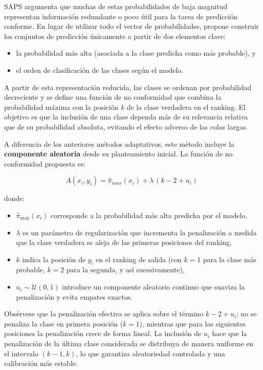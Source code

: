 SAPS argumenta que muchas de estas probabilidades de baja magnitud representan información redundante o poco útil para la tarea de predicción conforme. En lugar de utilizar todo el vector de probabilidades, propone construir los conjuntos de predicción únicamente a partir de dos elementos clave: 
\begin{itemize}
    \item la probabilidad más alta (asociada a la clase predicha como más probable), y
    \item el orden de clasificación de las clases según el modelo.
\end{itemize}

A partir de esta representación reducida, las clases se ordenan por probabilidad decreciente y se define una función de no conformidad que combina la probabilidad máxima con la posición $k$ de la clase verdadera en el ranking. El objetivo es que la inclusión de una clase dependa más de su relevancia relativa que de su probabilidad absoluta, evitando el efecto adverso de las colas largas.

A diferencia de los anteriores métodos adaptativos, este método incluye la \textbf{componente aleatoria} desde su planteamiento inicial. La función de no conformidad propuesta es:

$$
A(x_i, y_i) = \hat{\pi}_{max}(x_i) + \lambda \,(k - 2 + u_i)
$$

donde:  
\begin{itemize}
    \item $\hat{\pi}_{\max}(x_i)$ corresponde a la probabilidad más alta predicha por el modelo,  
    \item $\lambda$ es un parámetro de regularización que incrementa la penalización a medida que la clase verdadera se aleja de las primeras posiciones del ranking,  
    \item $k$ indica la posición de $y_i$ en el ranking de salida (con $k=1$ para la clase más probable, $k=2$ para la segunda, y así sucesivamente),  
    \item $u_i \sim \mathcal{U}(0,1)$ introduce un componente aleatorio continuo que suaviza la penalización y evita empates exactos.
\end{itemize}

Obsérvese que la penalización efectiva se aplica sobre el término $k - 2 + u_i$: no se penaliza la clase en primera posición ($k=1$), mientras que para las siguientes posiciones la penalización crece de forma lineal. La inclusión de $u_i$ hace que la penalización de la última clase considerada se distribuya de manera uniforme en el intervalo $(k-1, k)$, lo que garantiza aleatoriedad controlada y una calibración más estable.

